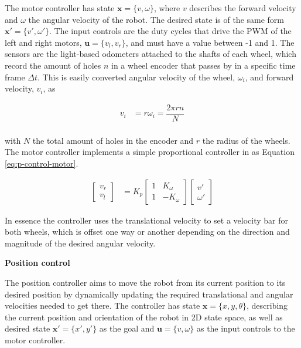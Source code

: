 The motor controller has state $\mathbf{x} = \{v, \omega\}$, where $v$ describes the forward velocity and $\omega$ the angular velocity of the robot. The desired state is of the same form $\mathbf{x}' = \{v', \omega'\}$. The input controls are the duty cycles that drive the PWM of the left and right motors, $\mathbf{u} = \{v_l, v_r\}$, and must have a value between -1 and 1. The sensors are the light-based odometers attached to the shafts of each wheel, which record the amount of holes $n$ in a wheel encoder that passes by in a specific time frame $\Delta t$. This is easily converted angular velocity of the wheel, $\omega_i$, and forward velocity, $v_i$, as

\begin{align}
    v_i &= r\omega_i = \dfrac{2 \pi r n}{N} \\
\end{align}

with $N$ the total amount of holes in the encoder and $r$ the radius of the wheels. The motor controller implements a simple proportional controller in as Equation \ref{eq:p-control-motor}.

\begin{align}
    \begin{bmatrix} v_r \\ v_l \end{bmatrix} &= K_p \begin{bmatrix}
        1 & K_\omega \\
        1 & -K_\omega
    \end{bmatrix} \begin{bmatrix}
        v' \\ \omega'
    \end{bmatrix}
    \label{eq:p-control-motor}
\end{align}

In essence the controller uses the translational velocity to set a velocity bar for both wheels, which is offset one way or another depending on the direction and magnitude of the desired angular velocity. 

\textbf{Position control}

The position controller aims to move the robot from its current position to its desired position by dynamically updating the required translational and angular velocities needed to get there. The controller has state $\mathbf{x} = \{x, y, \theta\}$, describing the current position and orientation of the robot in 2D state space, as well as desired state $\mathbf{x}'=\{x', y'\}$ as the goal and $\mathbf{u} = \{v, \omega\}$ as the input controls to the motor controller.

